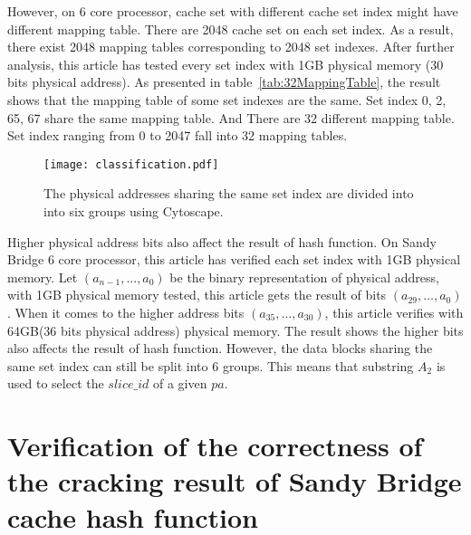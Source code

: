 \documentclass[conference]{IEEEtran}
\newcommand{\SliceID}{slice\_id }
\newcommand{\PhysicalAddressAbbreviation}{pa}
\newcommand{\MA}{\PhysicalAddressAbbreviation}
\newcommand{\PhysicalAddressWidth}{n}
\newcommand{\SandyBridge}{Sandy Bridge }
\begin{document}
However, on 6 core processor, cache set with different cache set index might have different mapping table. There are 2048 cache set on each set index. As a result, there exist 2048 mapping tables corresponding to 2048 set indexes. After further analysis, this article has tested every set index with 1GB physical memory (30 bits physical address). As presented in table~\ref{tab:32MappingTable}, the result shows that the mapping table of some set indexes are the same. Set index 0, 2, 65, 67 share the same mapping table. And There are 32 different mapping table. Set index ranging from 0 to 2047 fall into 32 mapping tables.
\begin{figure}[!htp]
\centering
\texttt{[image: classification.pdf]}
\caption{The physical addresses sharing the same set index are divided into into six groups using Cytoscape.}
\label{fig:classification}
\end{figure}

Higher physical address bits also affect the result of hash function. On Sandy Bridge 6 core processor, this article has verified each set index with 1GB physical memory. Let $\left(a_{\PhysicalAddressWidth-1},\dots,a_0\right)$ be the binary representation of physical address, with 1GB physical memory tested, this article gets the result of bits $\left(a_{29},\dots,a_0\right)$. When it comes to the higher address bits $\left(a_{35},\dots,a_{30}\right)$, this article verifies with 64GB(36 bits physical address) physical memory. The result shows the higher bits also affects the result of hash function. However, the data blocks sharing the same set index can still be split into 6 groups. This means that substring $A_2$ is used to select the $\SliceID$ of a given $\MA$.
\section{Verification of the correctness of the cracking result of \SandyBridge cache hash function}
\end{document}
